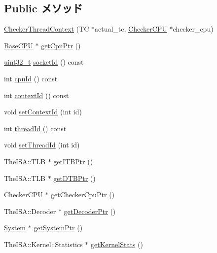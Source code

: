 \subsection*{Public メソッド}
\begin{DoxyCompactItemize}
\item 
\hyperlink{classCheckerThreadContext_ad7e28d441e829abce1f1e5b1a7a3779a}{CheckerThreadContext} (TC $\ast$actual\_\-tc, \hyperlink{classCheckerCPU}{CheckerCPU} $\ast$checker\_\-cpu)
\item 
\hyperlink{classBaseCPU}{BaseCPU} $\ast$ \hyperlink{classCheckerThreadContext_a4f35ce7d5cb2ec57504bc2c2bc03c879}{getCpuPtr} ()
\item 
\hyperlink{Type_8hh_a435d1572bf3f880d55459d9805097f62}{uint32\_\-t} \hyperlink{classCheckerThreadContext_a1ff97b43199001357718671a4d922d12}{socketId} () const 
\item 
int \hyperlink{classCheckerThreadContext_a1e2d18ebf4e21f2416c21a8b072e2c7b}{cpuId} () const 
\item 
int \hyperlink{classCheckerThreadContext_a651d5d14e7a4e95ebe6d7f5b8ee5a107}{contextId} () const 
\item 
void \hyperlink{classCheckerThreadContext_a0dd10037a5b0eadaddfe7c67d52d3ac6}{setContextId} (int id)
\item 
int \hyperlink{classCheckerThreadContext_afc38d04c77e7b5fc3bbb0dd00fc87742}{threadId} () const 
\item 
void \hyperlink{classCheckerThreadContext_a9186b553811fbde99263b3fd831f1b0c}{setThreadId} (int id)
\item 
TheISA::TLB $\ast$ \hyperlink{classCheckerThreadContext_a95b7e95d0558cd03d69613142fff9137}{getITBPtr} ()
\item 
TheISA::TLB $\ast$ \hyperlink{classCheckerThreadContext_a2fe6a07c44bc2a4d83b86bea605ba971}{getDTBPtr} ()
\item 
\hyperlink{classCheckerCPU}{CheckerCPU} $\ast$ \hyperlink{classCheckerThreadContext_a0807ebbe39e158fdf6007ca00e3f7252}{getCheckerCpuPtr} ()
\item 
TheISA::Decoder $\ast$ \hyperlink{classCheckerThreadContext_a6ae33963bc5f8b515f0a50c483f21c7f}{getDecoderPtr} ()
\item 
\hyperlink{classSystem}{System} $\ast$ \hyperlink{classCheckerThreadContext_af7bdb56e0088b380302741ad9008f321}{getSystemPtr} ()
\item 
TheISA::Kernel::Statistics $\ast$ \hyperlink{classCheckerThreadContext_a3faa5e314c06241296ab582bb891a06a}{getKernelStats} ()
\item 

\end{DoxyCompactItemize}

